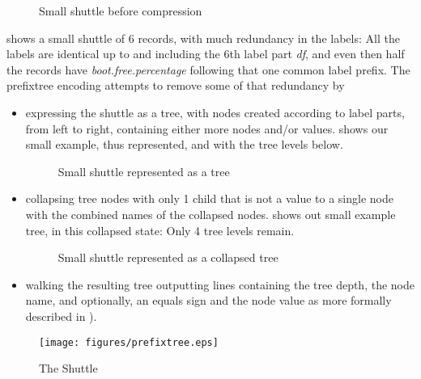 \begin{figure}[ht]
	\centering
    \caption{Small \rawproto{} shuttle before compression}
	\label{fig:smallshuttle}
\end{figure}

 shows a small shuttle of 6 records, with
much redundancy in the labels: All the labels are identical up to and
including the 6th label part \emph{df}, and even then half the records
have \emph{boot.free.percentage} following that one common label prefix.
The prefixtree encoding attempts to remove some of that redundancy by

\begin{itemize}

\item expressing the shuttle as a tree, with nodes created according
to label parts, from left to right, containing either more nodes
and\slash{}or values.  shows our small
example, thus represented, and with the tree levels below.

\begin{figure}[ht]
    \centering
    \caption{Small \rawordiffproto{} shuttle represented as a tree}
    \label{fig:smallshuttletree}
\end{figure}

\item collapsing tree nodes with only 1 child that is not a value to a
single node with the combined names of the collapsed nodes. 
shows out small example tree, in this collapsed state: Only 4 tree levels remain.

\begin{figure}[ht]
    \centering
    \caption{Small \rawordiffproto{} shuttle represented as a collapsed tree}
    \label{fig:smallshuttlecollapsedtree}
\end{figure}

\item walking the resulting tree outputting lines containing the tree
depth, the node name, and optionally, an equals sign and the node value
as more formally described in ).

\end{itemize}

\begin{figure}[ht]
	\centering
    \texttt{[image: figures/prefixtree.eps]} \caption{The
   \compproto{} Shuttle} \label{fig:prefixtree}
\end{figure}

